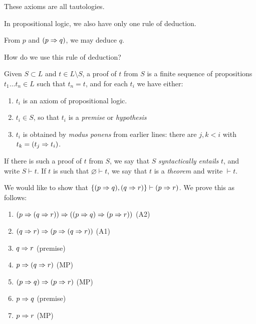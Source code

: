 \documentclass{article}
\begin{document}
\begin{note}
	These axioms are all tautologies.
\end{note}

In propositional logic, we also have only one rule of deduction.

\begin{definition}
	\label{propositional-modus-ponens}
    From $p$ and $(p \Rightarrow q)$, we may deduce $q$.
\end{definition}

How do we use this rule of deduction?

\begin{definition}[Proof]
	\label{propositional-proof}
    Given $S \subset L$ and $t \in L \setminus S$, a proof of $t$ from $S$ is a finite sequence of propositions $t_1 \dots t_n \in L$ such that $t_n = t$, and for each $t_i$ we have either:
    \begin{enumerate}
    	\item $t_i$ is an axiom of propositional logic.
    	\item $t_i \in S$, so that $t_i$ is a \textit{premise} or \textit{hypothesis}
    	\item $t_i$ is obtained by \textit{modus ponens} from earlier lines: there are $j, k < i$ with $t_k = (t_j \Rightarrow t_i)$.
	\end{enumerate}
	If there is such a proof of $t$ from $S$, we say that $S$ \textit{syntactically entails} $t$, and write $S \vdash t$. If $t$ is such that $\varnothing \vdash t$, we say that $t$ is a \textit{theorem} and write $\vdash t$. 
\end{definition}

\begin{example}
    We would like to show that $\left\lbrace (p \Rightarrow q), (q \Rightarrow r) \right\rbrace \vdash (p \Rightarrow r)$. We prove this as follows:
    \begin{enumerate}
    \item $(p \Rightarrow (q \Rightarrow r)) \Rightarrow ((p \Rightarrow q) \Rightarrow (p \Rightarrow r))$ \hfill (A2)
    \item $(q \Rightarrow r) \Rightarrow (p \Rightarrow (q \Rightarrow r))$ \hfill (A1)
    \item $q \Rightarrow r$ \hfill (premise)
    \item $p \Rightarrow (q \Rightarrow r)$ \hfill (MP)
    \item $(p \Rightarrow q) \Rightarrow (p \Rightarrow r)$ \hfill (MP)
    \item $p \Rightarrow q$ \hfill (premise)
    \item $p \Rightarrow r$ \hfill (MP)
	\end{enumerate}
\end{example}
\end{document}
